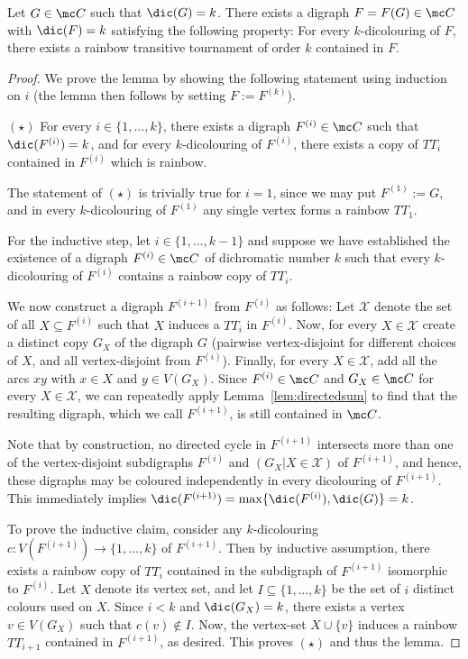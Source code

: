 \begin{lemma}\label{lem:rainbow}
Let $G \in \mc C$ such that $\dic(G)=k$. There exists a digraph $F=F(G) \in \mc C$ with $\dic(F)=k$ satisfying the following property: For every $k$-dicolouring of $F$, there exists a rainbow transitive tournament of order $k$ contained in $F$.
\end{lemma}
\begin{proof}
We prove the lemma by showing the following statement using induction on $i$ (the lemma then follows by setting $F:=F^{(k)}$). 

\medskip

$(\star)$ For every $i \in \{1,\ldots,k\}$, there exists a digraph $F^{(i)} \in \mc C$ such that $\dic(F^{(i)})=k$, and for every $k$-dicolouring of $F^{(i)}$, there exists a copy of $TT_i$ contained in $F^{(i)}$ which is rainbow.

\medskip

The statement of $(\star)$ is trivially true for $i=1$, since we may put $F^{(1)}:=G$, and in every $k$-dicolouring of $F^{(1)}$ any single vertex forms a rainbow $TT_1$. 

For the inductive step, let $i \in \{1,\ldots,k-1\}$ and suppose we have established the existence of a digraph $F^{(i)} \in \mc C$ of dichromatic number $k$ such that every $k$-dicolouring of $F^{(i)}$ contains a rainbow copy of $TT_i$. 

We now construct a digraph $F^{(i+1)}$ from $F^{(i)}$ as follows: Let $\mathcal{X}$ denote the set of all $X \subseteq F^{(i)}$ such that $X$ induces a $TT_i$ in $F^{(i)}$. Now, for every $X \in \mathcal{X}$ create a distinct copy $G_X$ of the digraph $G$ (pairwise vertex-disjoint for different choices of $X$, and all vertex-disjoint from $F^{(i)}$). Finally, for every $X\in \mathcal{X}$, add all the arcs $xy$ with $x \in X$ and $y \in V(G_X)$. Since $F^{(i)} \in \mc C$ and $G_X \in \mc C$ for every $X \in \mathcal{X}$, we can repeatedly apply Lemma~\ref{lem:directedsum} to find that the resulting digraph, which we call $F^{(i+1)}$, is still contained in $\mc C$. 

Note that by construction, no directed cycle in $F^{(i+1)}$ intersects more than one of the vertex-disjoint subdigraphs $F^{(i)}$ and  $(G_X|X \in \mathcal{X})$ of $F^{(i+1)}$, and hence, these digraphs may be coloured independently in every dicolouring of $F^{(i+1)}$. This immediately implies $\dic(F^{(i+1)})=\max\{\dic(F^{(i)}),\dic(G)\}=k$. 

To prove the inductive claim, consider any $k$-dicolouring $c:V(F^{(i+1)}) \rightarrow \{1,\ldots,k\}$ of $F^{(i+1)}$. Then by inductive assumption, there exists a rainbow copy of $TT_i$ contained in the subdigraph of $F^{(i+1)}$ isomorphic to $F^{(i)}$. Let $X$ denote its vertex set, and let $I \subseteq \{1,\ldots,k\}$ be the set of $i$ distinct colours used on $X$. Since $i<k$ and $\dic(G_X)=k$, there exists a vertex $v \in V(G_X)$ such that $c(v) \notin I$. Now, the vertex-set $X \cup \{v\}$ induces a rainbow $TT_{i+1}$ contained in $F^{(i+1)}$, as desired. This proves $(\star)$ and thus the lemma. 

\end{proof}
